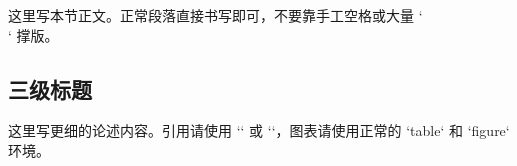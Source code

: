 %

\label{chap:your-chapter}


这里写本节正文。正常段落直接书写即可，不要靠手工空格或大量 `\\` 撑版。

\subsection{三级标题}

这里写更细的论述内容。引用请使用 `\cite{}` 或 `\upcite{}`，图表请使用正常的 `table` 和 `figure` 环境。
